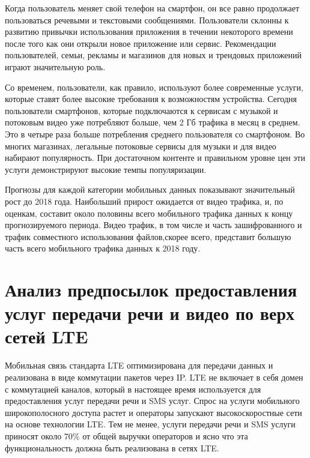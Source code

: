 Когда пользователь меняет свой телефон на смартфон, он все равно продолжает пользоваться речевыми и текстовыми сообщениями. Пользователи склонны к развитию привычки использования приложения в течении некоторого времени после того как они открыли новое приложение или сервис. Рекомендации пользователей, семьи, рекламы и магазинов для новых и трендовых приложений играют значительную роль. 

Со временем, пользователи, как правило, используют более современные услуги, которые ставят более высокие требования к возможностям устройства. Сегодня пользователи смартфонов, которые подключаются к сервисам с музыкой и потоковым видео уже потребляют больше, чем 2 Гб трафика в месяц в среднем. Это в четыре раза больше потребления среднего пользователя со смартфоном. Во многих магазинах, легальные потоковые сервисы для музыки и для видео набирают популярность. При достаточном контенте и правильном уровне цен эти услуги демонстрируют высокие темпы популяризации.

Прогнозы для каждой категории мобильных данных показывают значительный рост до 2018 года. Наибольший прирост ожидается от видео трафика, и, по оценкам, составит около половины всего мобильного трафика данных к концу прогнозируемого периода. Видео трафик, в том числе и часть зашифрованного и трафик совместного использования файлов,скорее всего, представит большую часть всего мобильного трафика данных к 2018 году.


















\section{Анализ предпосылок предоставления услуг передачи речи и видео по верх сетей LTE} \label{sect1_4}



Мобильная связь стандарта LTE оптимизирована для передачи данных и реализована в виде коммутации пакетов через IP. LTE не включает в себя домен с коммутацией каналов, который в настоящее время используется для предоставления услуг передачи речи и SMS услуг. Спрос на услуги мобильного широкополосного доступа растет и операторы запускают высокоскоростные сети на основе технологии LTE. Тем не менее, услуги передачи речи и SMS услуги приносят около 70\% от общей выручки операторов и ясно что эта функциональность должна быть реализована в сетях LTE.


